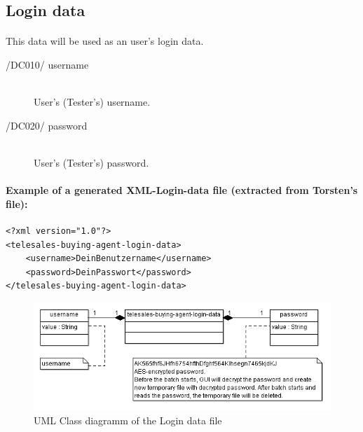 \subsection{Login data}
\paragraph{}This data will be used as an user's login data.
\begin{description}
\item[/DC010/ username]\hfill\\ User's (Tester's) username.
\item[/DC020/ password]\hfill\\ User's (Tester's) password.
\end{description}

\paragraph{Example of a generated XML-Login-data file (extracted from Torsten's file):}
\begin{verbatim}
<?xml version="1.0"?>
<telesales-buying-agent-login-data>
    <username>DeinBenutzername</username>
    <password>DeinPasswort</password>
</telesales-buying-agent-login-data>
\end{verbatim}

\begin{figure}[h!]
\centering
\includegraphics[width=\textwidth]{d_class_login-data.png}
\caption{UML Class diagramm of the Login data file}
\end{figure}
